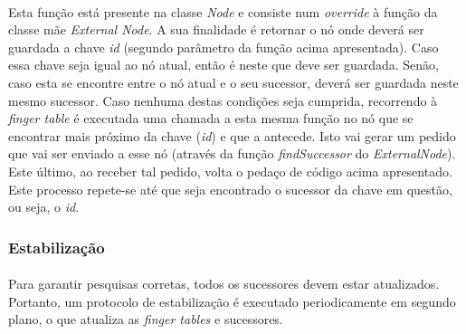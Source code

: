 \documentclass[11pt,oneside]{book}
\begin{document}
    \paragraph{}
    Esta função está presente na classe \textit{Node} e consiste num \textit{override} à função
    da classe mãe \textit{External Node}. A sua finalidade é retornar o nó onde deverá ser guardada
    a chave \textit{id} (segundo parâmetro da função acima apresentada). Caso essa chave seja
    igual ao nó atual, então é neste que deve ser guardada. Senão, caso esta se encontre entre
    o nó atual e o seu sucessor, deverá ser guardada neste mesmo sucessor. Caso nenhuma destas condições
    seja cumprida, recorrendo à \textit{finger table} é executada uma chamada a esta mesma função
    no nó que se encontrar mais próximo da chave (\textit{id}) e que a antecede. Isto vai gerar um 
    pedido que vai ser enviado a esse nó (através da função \textit{findSuccessor} do \textit{ExternalNode}).
    Este último, ao receber tal pedido, volta o pedaço de código acima apresentado. Este processo repete-se
    até que seja encontrado o sucessor da chave em questão, ou seja, o \textit{id}.

    \pagebreak

    \subsubsection{Estabilização}
    \paragraph{}
    Para garantir pesquisas corretas, todos os sucessores devem estar atualizados. Portanto, um 
    protocolo de estabilização é executado periodicamente em segundo plano, o que atualiza 
    as \textit{finger tables} e sucessores.
\end{document}
